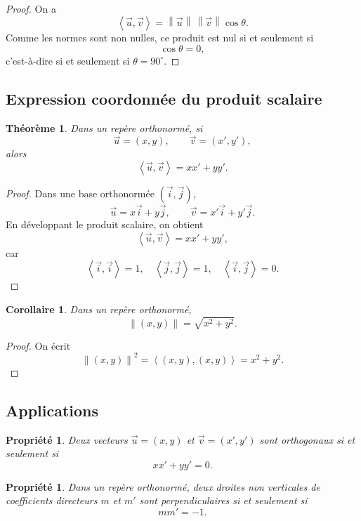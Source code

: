 \documentclass[11pt,a4paper]{article}
\newcommand{\norme}[1]{\left\|#1\right\|}
\newcommand{\ps}[2]{\left\langle #1,#2\right\rangle}
\newcommand{\uu}{\overrightarrow{u}}
\newcommand{\vv}{\overrightarrow{v}}
\theoremstyle{definition}
\theoremstyle{plain}
\newtheorem{propriete}[definition]{Propriété}
\newtheorem{theoreme}[definition]{Théorème}
\newtheorem{corollaire}[definition]{Corollaire}
\begin{document}
\begin{proof}
On a
\[
\ps{\uu}{\vv}=\norme{\uu}\,\norme{\vv}\cos\theta.
\]
Comme les normes sont non nulles, ce produit est nul si et seulement si
\[
\cos\theta=0,
\]
c'est-à-dire si et seulement si $\theta=90^\circ$.
\end{proof}

\subsection{Expression coordonnée du produit scalaire}

\begin{theoreme}
Dans un repère orthonormé, si
\[
\uu=(x,y),\qquad \vv=(x',y'),
\]
alors
\[
\ps{\uu}{\vv}=xx'+yy'.
\]
\end{theoreme}

\begin{proof}
Dans une base orthonormée $(\overrightarrow{i},\overrightarrow{j})$,
\[
\uu=x\overrightarrow{i}+y\overrightarrow{j},
\qquad
\vv=x'\overrightarrow{i}+y'\overrightarrow{j}.
\]
En développant le produit scalaire, on obtient
\[
\ps{\uu}{\vv}=xx'+yy',
\]
car
\[
\ps{\overrightarrow{i}}{\overrightarrow{i}}=1,\quad
\ps{\overrightarrow{j}}{\overrightarrow{j}}=1,\quad
\ps{\overrightarrow{i}}{\overrightarrow{j}}=0.
\]
\end{proof}

\begin{corollaire}
Dans un repère orthonormé,
\[
\norme{(x,y)}=\sqrt{x^2+y^2}.
\]
\end{corollaire}

\begin{proof}
On écrit
\[
\norme{(x,y)}^2=\ps{(x,y)}{(x,y)}=x^2+y^2.
\]
\end{proof}

\subsection{Applications}

\begin{propriete}
Deux vecteurs $\uu=(x,y)$ et $\vv=(x',y')$ sont orthogonaux si et seulement si
\[
xx'+yy'=0.
\]
\end{propriete}

\begin{propriete}
Dans un repère orthonormé, deux droites non verticales de coefficients directeurs $m$ et $m'$ sont perpendiculaires si et seulement si
\[
mm'=-1.
\]
\end{propriete}
\end{document}
